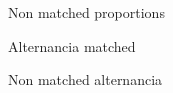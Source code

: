 \documentclass{article}
\begin{document}
\begin{figure}[H]
  \caption{Non matched proportions}
  \noindent{}
  \centering
\end{figure}

\begin{figure}[H]
  \caption{Alternancia matched}
  \noindent{}
  \centering
\end{figure}

\begin{figure}[H]
  \caption{Non matched alternancia}
  \noindent{}
  \centering
\end{figure}
\end{document}
